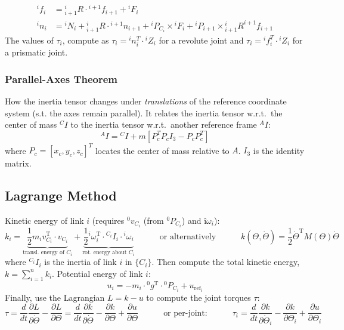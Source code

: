 $$
\begin{aligned}
		{ }^{i} f_{i} &={ }_{i+1}^{i} R \cdot{ }^{i+1} f_{i+1}+{ }^{i} F_{i} \\
		{ }^{i} n_{i} &={ }^{i} N_{i}+{ }_{i+1}^{i} R \cdot{ }^{i+1} n_{i+1}+{ }^{i} P_{C_{i}} \times{ }^{i} F_{i}+{ }^{i} P_{i+1} \times{ }_{i+1}^{i} R^{i+1} f_{i+1}
	\end{aligned}
$$
The values of $\tau_i$, compute as $\tau_i = {}^in^T_i \cdot {}^iZ_i$ for a revolute joint and $\tau_i = {}^if^T_i \cdot {}^iZ_i$ for a prismatic joint.

\subsubsection{Parallel-Axes Theorem}

How the inertia tensor changes under \textit{translations} of the reference coordinate system (s.t. the axes remain parallel). It relates the inertia tensor w.r.t.\ the center of mass ${}^CI$ to the inertia tensor w.r.t.\ another reference frame ${}^AI$:
\[ {}^{A} I = {}^{C} I + m [P_{c}^T P_{c} I_{3} - P_{c} P_{c}^T] \]
where $ P_{c} = [x_{c} , y_{c} , z_{c}]^T $ locates the center of mass relative to $A$. $ I_{3} $ is the identity matrix.

\subsection{Lagrange Method}

Kinetic energy of link $i$ (requires ${}^0v_{C_i}$ (from ${}^0P_{C_i}$) and ${}î \omega_i$):
$$
k_{i}=\underbrace{\frac{1}{2} m_{i} v_{C_{i}}^{\mathrm{T}} \cdot v_{C_{i}}}_{\text{transl.\ energy of }C_{i}}
+\underbrace{\frac{1}{2} {}^i \omega_{i}^{\mathrm{T}} \cdot{ }^{C_{i}} I_{i} \cdot{ }^{i} \omega_{i}}_{\text{rot.\ energy about }C_{i}}
\quad\quad\quad\text{or alternatively}\quad\quad\quad
k(\Theta, \dot{\Theta})=\frac{1}{2} \dot{\Theta}^{\mathrm{T}} M(\Theta) \dot{\Theta}
$$
where ${ }^{C_{i}} I_{i}$ is the inertia of link $i$ in $\{C_i\}$. Then compute the total kinetic energy, $k=\sum_{i=1}^{n} k_{i}$. Potential energy of link $i$:
$$
u_{i}=-m_{i} \cdot{ }^{0} g^{\mathrm{T}} \cdot{ }^{0} P_{C_{i}}+u_{\mathrm{ref}_{i}}
$$
Finally, use the Lagrangian $L=k-u$ to compute the joint torques $\tau$:
$$
\tau=\frac{d}{dt} \frac{\partial L}{\partial \dot{\Theta}} - \frac{\partial L}{\partial \Theta}
=\frac{d}{d t} \frac{\partial k}{\partial \dot{\Theta}}-\frac{\partial k}{\partial \Theta}+\frac{\partial u}{\partial \Theta}
\quad\quad\quad\text{or per-joint:}\quad\quad\quad
\tau_{i}=\frac{d}{d t} \frac{\partial k}{\partial \dot{\Theta}_{i}}-\frac{\partial k}{\partial \Theta_{i}}+\frac{\partial u}{\partial \Theta_{i}}
$$


